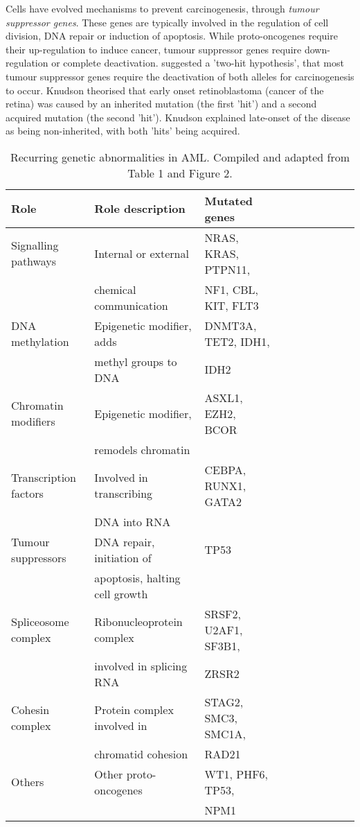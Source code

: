 Cells have evolved mechanisms to prevent carcinogenesis, through \textit{tumour suppressor genes}. These genes are typically involved in the regulation of cell division, DNA repair or induction of apoptosis. While proto-oncogenes require their up-regulation to induce cancer, tumour suppressor genes require down-regulation or complete deactivation. \cite{knudson1971mutation} suggested a 'two-hit hypothesis', that most tumour suppressor genes require the deactivation of both alleles for carcinogenesis to occur. Knudson theorised that early onset retinoblastoma (cancer of the retina) was caused by an inherited mutation (the first 'hit') and a second acquired mutation (the second 'hit'). Knudson explained late-onset of the disease as being non-inherited, with both 'hits' being acquired. 

\clearpage
\begin{table}[H]
\label{tab:genetic abnormalities}
    \centering
    \caption{Recurring genetic abnormalities in \ac{AML}. Compiled and adapted from \cite{dinardo2016mutations} Table 1 and \cite{lindsley2015acute} Figure 2.}
    \begin{tabular}{llllllllll}
    \toprule
\textbf{Role} & \textbf{Role description} & \textbf{Mutated genes} &  &  \\ \midrule
Signalling pathways & Internal or external & NRAS, KRAS, PTPN11, &  &  \\
 & chemical communication & NF1, CBL, KIT, FLT3 &  &  \\ \hline
DNA methylation & Epigenetic modifier, adds & DNMT3A, TET2, IDH1, &  &  \\
 & methyl groups to DNA & IDH2 &  &  \\ \hline
Chromatin modifiers & Epigenetic modifier, & ASXL1, EZH2, BCOR &  &  \\
 & remodels chromatin &  &  &  \\ \hline
Transcription factors & Involved in transcribing & CEBPA, RUNX1, GATA2 &  &  \\
 & DNA into RNA &  &  &  \\ \hline
Tumour suppressors & DNA repair, initiation of & TP53 &  &  \\
 & apoptosis, halting cell growth &  &  &  \\ \hline
Spliceosome complex & Ribonucleoprotein complex & SRSF2, U2AF1, SF3B1, &  &  \\
 & involved in splicing RNA & ZRSR2 &  &  \\ \hline
Cohesin complex & Protein complex involved in & STAG2, SMC3, SMC1A, &  &  \\
 & chromatid cohesion & RAD21 &  &  \\ \hline
Others & Other proto-oncogenes & WT1, PHF6, TP53, &  &  \\
 &  & NPM1 &  &  \\ \bottomrule
    \end{tabular}
\end{table}

